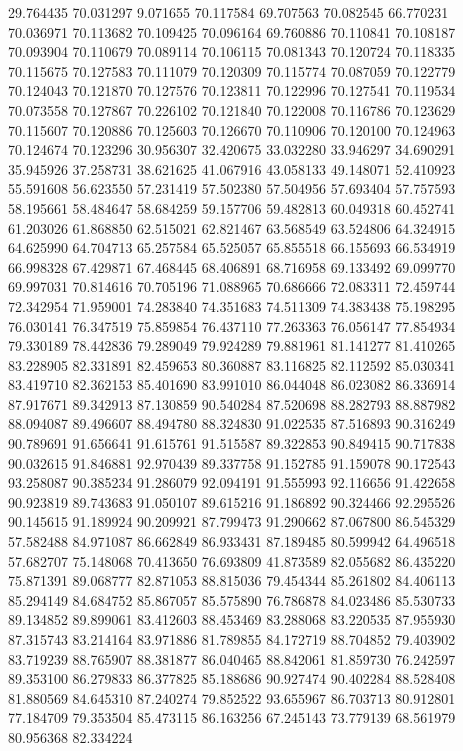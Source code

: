 29.764435
70.031297
9.071655
70.117584
69.707563
70.082545
66.770231
70.036971
70.113682
70.109425
70.096164
69.760886
70.110841
70.108187
70.093904
70.110679
70.089114
70.106115
70.081343
70.120724
70.118335
70.115675
70.127583
70.111079
70.120309
70.115774
70.087059
70.122779
70.124043
70.121870
70.127576
70.123811
70.122996
70.127541
70.119534
70.073558
70.127867
70.226102
70.121840
70.122008
70.116786
70.123629
70.115607
70.120886
70.125603
70.126670
70.110906
70.120100
70.124963
70.124674
70.123296
30.956307
32.420675
33.032280
33.946297
34.690291
35.945926
37.258731
38.621625
41.067916
43.058133
49.148071
52.410923
55.591608
56.623550
57.231419
57.502380
57.504956
57.693404
57.757593
58.195661
58.484647
58.684259
59.157706
59.482813
60.049318
60.452741
61.203026
61.868850
62.515021
62.821467
63.568549
63.524806
64.324915
64.625990
64.704713
65.257584
65.525057
65.855518
66.155693
66.534919
66.998328
67.429871
67.468445
68.406891
68.716958
69.133492
69.099770
69.997031
70.814616
70.705196
71.088965
70.686666
72.083311
72.459744
72.342954
71.959001
74.283840
74.351683
74.511309
74.383438
75.198295
76.030141
76.347519
75.859854
76.437110
77.263363
76.056147
77.854934
79.330189
78.442836
79.289049
79.924289
79.881961
81.141277
81.410265
83.228905
82.331891
82.459653
80.360887
83.116825
82.112592
85.030341
83.419710
82.362153
85.401690
83.991010
86.044048
86.023082
86.336914
87.917671
89.342913
87.130859
90.540284
87.520698
88.282793
88.887982
88.094087
89.496607
88.494780
88.324830
91.022535
87.516893
90.316249
90.789691
91.656641
91.615761
91.515587
89.322853
90.849415
90.717838
90.032615
91.846881
92.970439
89.337758
91.152785
91.159078
90.172543
93.258087
90.385234
91.286079
92.094191
91.555993
92.116656
91.422658
90.923819
89.743683
91.050107
89.615216
91.186892
90.324466
92.295526
90.145615
91.189924
90.209921
87.799473
91.290662
87.067800
86.545329
57.582488
84.971087
86.662849
86.933431
87.189485
80.599942
64.496518
57.682707
75.148068
70.413650
76.693809
41.873589
82.055682
86.435220
75.871391
89.068777
82.871053
88.815036
79.454344
85.261802
84.406113
85.294149
84.684752
85.867057
85.575890
76.786878
84.023486
85.530733
89.134852
89.899061
83.412603
88.453469
83.288068
83.220535
87.955930
87.315743
83.214164
83.971886
81.789855
84.172719
88.704852
79.403902
83.719239
88.765907
88.381877
86.040465
88.842061
81.859730
76.242597
89.353100
86.279833
86.377825
85.188686
90.927474
90.402284
88.528408
81.880569
84.645310
87.240274
79.852522
93.655967
86.703713
80.912801
77.184709
79.353504
85.473115
86.163256
67.245143
73.779139
68.561979
80.956368
82.334224

